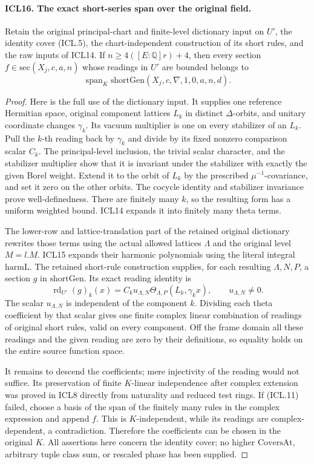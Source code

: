 \paragraph{ICL16. The exact short-series span over the original field.}
\label{claim:ICL16}
Retain the original principal-chart and finite-level
dictionary input on \(U'\), the identity cover (ICL.5),
the chart-independent construction of its short rules,
and the raw inputs of ICL14.  If
\(n\geq4([E:\mathbb Q]r)+4\), then every section
\(f\in\mathrm{sec}(X_j,c,a,n)\) whose readings in
\(U'\) are bounded belongs to
\[
 \operatorname{span}_K\mathrm{shortGen}
                     (X_j,c,\nabla,1,0,a,n,d).        \tag{ICL.11}
\]
\begin{proof}
Here is the full use of the dictionary input.  It supplies
one reference Hermitian space, original component
lattices \(L_k\) in distinct \(\Delta\)-orbits, and
unitary coordinate changes \(\gamma_k\).  Its vacuum
multiplier is one on every stabilizer of an \(L_k\).
Pull the \(k\)-th reading back by \(\gamma_k\) and
divide by its fixed nonzero comparison scalar \(C_k\).
The principal-level inclusion, the trivial scalar
character, and the stabilizer multiplier show that it
is invariant under the stabilizer with exactly the
given Borel weight.  Extend it to the orbit of \(L_k\)
by the prescribed \(\mu^{-1}\)-covariance, and set it
zero on the other orbits.  The cocycle identity and
stabilizer invariance prove well-definedness.  There
are finitely many \(k\), so the resulting form has
a uniform weighted bound.  ICL14 expands it into
finitely many theta terms.

The lower-row and lattice-translation part of the
retained original dictionary rewrites those terms
using the actual allowed lattices \(\Lambda\) and
the original level \(M=l.M\).  ICL15 expands their
harmonic polynomials using the literal integral
\(\mathrm{harmL}\).  The retained short-rule
construction supplies, for each resulting \(\Lambda,N,P\),
a section \(g\) in \(\mathrm{shortGen}\).  Its exact
reading identity is
\[
 \operatorname{rd}_{U'}(g)_k(x)
   =C_k u_{\Lambda,N}
       \Theta_{\Lambda,P}(L_k,\gamma_k x),
            \qquad u_{\Lambda,N}\ne0.                 \tag{ICL.12}
\]
The scalar \(u_{\Lambda,N}\) is independent of the
component \(k\).  Dividing each theta coefficient by
that scalar gives one finite complex linear
combination of readings of original short rules,
valid on every component.  Off the frame domain all
these readings and the given reading are zero by
their definitions, so equality holds on the entire
source function space.

It remains to descend the coefficients; mere
injectivity of the reading would not suffice.  Its
preservation of finite \(K\)-linear independence
after complex extension was proved in ICL8 directly
from naturality and reduced test rings.  If (ICL.11)
failed, choose a basis of the span of the finitely
many rules in the complex expression and append
\(f\).  This is \(K\)-independent, while its readings
are complex-dependent, a contradiction.  Therefore
the coefficients can be chosen in the original
\(K\).  All assertions here concern the identity
cover; no higher \(\mathrm{CoversAt}\), arbitrary
tuple class sum, or rescaled phase has been supplied.
\end{proof}
